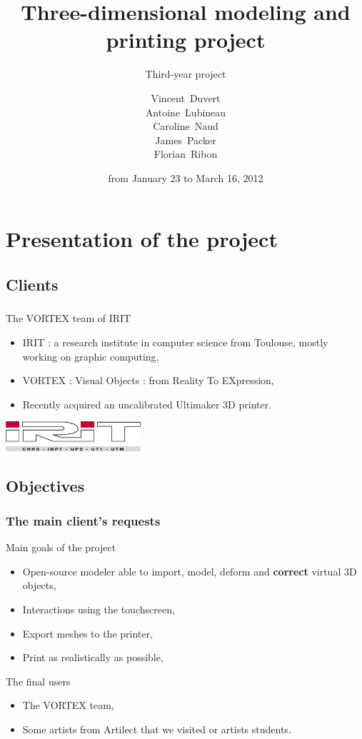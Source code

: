\documentclass{beamer}
\title{Three-dimensional modeling and printing project}
\subtitle{Third-year project}
\author[V. Duvert, A. Lubineau, C. Naud, J. Packer, F. Ribon]{\scriptsize
Vincent~Duvert \\ Antoine~Lubineau \\ Caroline~Naud \\ James~Packer \\ Florian~Ribon}
\date{from January 23 to March 16, 2012}
\begin{document}
\frame{\titlepage}

\section{Presentation of the project}

\subsection{Clients}
\begin{frame}
	\frametitle{}
	
	\begin{block}{The \textsc{VORTEX} team of IRIT}
		\begin{itemize}
		\item \textsc{IRIT} : a research institute in computer science from Toulouse, mostly working on graphic computing,
		\item \textsc{VORTEX} : Visual Objects : from Reality To EXpression,
		\item Recently acquired an uncalibrated Ultimaker 3D printer.
		\end{itemize}
    \end{block}
    
    \begin{center}
		\includegraphics[width=5cm]{irit}
	\end{center}
    
\end{frame}

\subsection{Objectives}
\begin{frame}
	\frametitle{The main client's requests}
	\begin{block}{Main goals of the project} 
	\begin{itemize}
		\item Open-source modeler able to import, model, deform and \textbf{correct} virtual 3D objects,
		\item Interactions using the touchscreen,
		\item Export meshes to the printer,
		\item Print as realistically as possible,
	\end{itemize}
    \end{block}
    
    \begin{block}{The final users}
    	\begin{itemize}
		\item The VORTEX team,
		\item Some artists from Artilect that we visited or artists students.
		\end{itemize}
    \end{block}

\end{frame}
\end{document}
